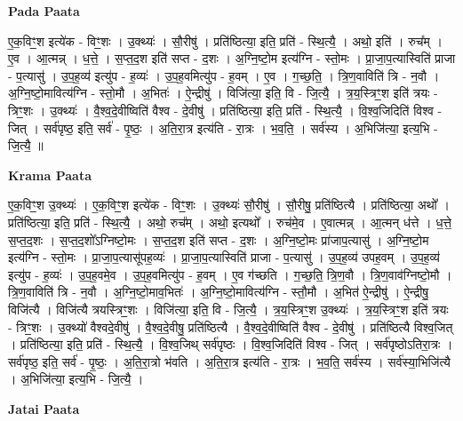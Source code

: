 \documentclass[17pt]{extarticle}
\begin{document}
\textbf{Pada Paata} \newline

ए॒क॒विꣳ॒॒श इत्ये॑क - विꣳ॒॒शः । उ॒क्थ्यः॑ । सौ॒रीषु॑ । प्रति॑ष्ठित्या॒ इति॒ प्रति॑ - स्थि॒त्यै॒ । अथो॒ इति॑ । रुच᳚म् । ए॒व । आ॒त्मन्न् । ध॒त्ते॒ । स॒प्त॒द॒श इति॑ सप्त - द॒शः । अ॒ग्नि॒ष्टो॒म इत्य॑ग्नि - स्तो॒मः । प्रा॒जा॒प॒त्यास्विति॑ प्राजा - प॒त्यासु॑ । उ॒प॒ह॒व्य॑ इत्यु॑प - ह॒व्यः॑ । उ॒प॒ह॒वमित्यु॑प - ह॒वम् । ए॒व । ग॒च्छ॒ति॒ । त्रि॒ण॒वाविति॑ त्रि - न॒वौ । अ॒ग्नि॒ष्टो॒मावित्य॑ग्नि - स्तो॒मौ । अ॒भितः॑ । ऐ॒न्द्रीषु॑ । विजि॑त्या॒ इति॒ वि - जि॒त्यै॒ । त्र॒य॒स्त्रिꣳ॒॒श इति॑ त्रयः - त्रिꣳ॒॒शः । उ॒क्थ्यः॑ । वै॒श्व॒दे॒वीष्विति॑ वैश्व - दे॒वीषु॑ । प्रति॑ष्ठित्या॒ इति॒ प्रति॑ - स्थि॒त्यै॒ । वि॒श्व॒जिदिति॑ विश्व - जित् । सर्व॑पृष्ठ॒ इति॒ सर्व॑ - पृ॒ष्ठः॒ । अ॒ति॒रा॒त्र इत्य॑ति - रा॒त्रः । भ॒व॒ति॒ । सर्व॑स्य । अ॒भिजि॑त्या॒ इत्य॒भि - जि॒त्यै॒ ॥  \newline


\textbf{Krama Paata} \newline

ए॒क॒विꣳ॒॒श उ॒क्थ्यः॑ । ए॒क॒विꣳ॒॒श इत्ये॑क - विꣳ॒॒शः । उ॒क्थ्यः॑ सौ॒रीषु॑ । सौ॒रीषु॒ प्रति॑ष्ठित्यै । प्रति॑ष्ठित्या॒ अथो᳚ । प्रति॑ष्ठित्या॒ इति॒ प्रति॑ - स्थि॒त्यै॒ । अथो॒ रुच᳚म् । अथो॒ इत्यथो᳚ । रुच॑मे॒व । ए॒वात्मन्न् । आ॒त्मन् ध॑त्ते । ध॒त्ते॒ स॒प्त॒द॒शः । स॒प्त॒द॒शो᳚ऽग्निष्टो॒मः । स॒प्त॒द॒श इति॑ सप्त - द॒शः । अ॒ग्नि॒ष्टो॒मः प्रा॑जाप॒त्यासु॑ । अ॒ग्नि॒ष्टो॒म इत्य॑ग्नि - स्तो॒मः । प्रा॒जा॒प॒त्यासू॑पह॒व्यः॑ । प्रा॒जा॒प॒त्यास्विति॑ प्राजा - प॒त्यासु॑ । उ॒प॒ह॒व्य॑ उपह॒वम् । उ॒प॒ह॒व्य॑ इत्यु॑प - ह॒व्यः॑ । उ॒प॒ह॒वमे॒व । उ॒प॒ह॒वमित्यु॑प - ह॒वम् । ए॒व ग॑च्छति । ग॒च्छ॒ति॒ त्रि॒ण॒वौ । त्रि॒ण॒वाव॑ग्निष्टो॒मौ । त्रि॒ण॒वाविति॑ त्रि - न॒वौ । अ॒ग्नि॒ष्टो॒माव॒भितः॑ । अ॒ग्नि॒ष्टो॒मावित्य॑ग्नि - स्तौ॒मौ । अ॒भित॑ ऐ॒न्द्रीषु॑ । ऐ॒न्द्रीषु॒ विजि॑त्यै । विजि॑त्यै त्रयस्त्रिꣳ॒॒शः । विजि॑त्या॒ इति॒ वि - जि॒त्यै॒ । त्र॒य॒स्त्रिꣳ॒॒श उ॒क्थ्यः॑ । त्र॒य॒स्त्रिꣳ॒॒श इति॑ त्रयः - त्रिꣳ॒॒शः । उ॒क्थ्यो॑ वैश्वदे॒वीषु॑ । वै॒श्व॒दे॒वीषु॒ प्रति॑ष्ठित्यै । वै॒श्व॒दे॒वीष्विति॑ वैश्व - दे॒वीषु॑ । प्रति॑ष्ठित्यै विश्व॒जित् । प्रति॑ष्ठित्या॒ इति॒ प्रति॑ - स्थि॒त्यै॒ । वि॒श्व॒जिथ् सर्व॑पृष्ठः । वि॒श्व॒जिदिति॑ विश्व - जित् । सर्व॑पृष्ठोऽतिरा॒त्रः । सर्व॑पृष्ठ॒ इति॒ सर्व॑ - पृ॒ष्ठः॒ । अ॒ति॒रा॒त्रो भ॑वति । अ॒ति॒रा॒त्र इत्य॑ति - रा॒त्रः । भ॒व॒ति॒ सर्व॑स्य । सर्व॑स्या॒भिजि॑त्यै । अ॒भिजि॑त्या॒ इत्य॒भि - जि॒त्यै॒ । \newline

\textbf{Jatai Paata} \newline
\end{document}
